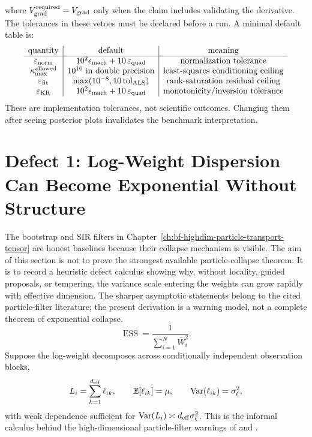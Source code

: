 where \(V_{\rm grad}^{\rm required}=V_{\rm grad}\) only when the claim includes
validating the derivative.  The tolerances in these vetoes must be declared
before a run.  A minimal default table is:
\begin{equation}
\begin{array}{c|c|c}
\text{quantity} & \text{default} & \text{meaning}\\
\hline
\varepsilon_{\rm norm} & 10^2\epsilon_{\rm mach}+10\,\varepsilon_{\rm quad} & \text{normalization tolerance}\\
\kappa_{\rm max}^{\rm allowed} & 10^{10}\ \text{in double precision} & \text{least-squares conditioning ceiling}\\
\varepsilon_{\rm fit} & \max(10^{-8},10\,{\rm tol}_{\rm ALS}) & \text{rank-saturation residual ceiling}\\
\varepsilon_{\rm KR} & 10^2\epsilon_{\rm mach}+10\,\varepsilon_{\rm quad} & \text{monotonicity/inversion tolerance}
\end{array}
  \label{eq:bf-hd-veto-defaults}
\end{equation}
These are implementation tolerances, not scientific outcomes.  Changing them
after seeing posterior plots invalidates the benchmark interpretation.

\section[Particle Collapse]{Defect 1: Log-Weight Dispersion Can Become Exponential Without Structure}
\label{sec:bf-hd-defect-particles}

The bootstrap and SIR filters in Chapter~\ref{ch:bf-highdim-particle-transport-tensor}
are honest baselines because their collapse mechanism is visible.  The aim of
this section is not to prove the strongest available particle-collapse theorem.
It is to record a heuristic defect calculus showing why, without locality,
guided proposals, or tempering, the variance scale entering the weights can grow
rapidly with effective dimension.  The sharper asymptotic statements belong to
the cited particle-filter literature; the present derivation is a warning model,
not a complete theorem of exponential collapse.
\begin{equation}
  \operatorname{ESS}=\frac{1}{\sum_{i=1}^N \bar W_i^2}.
  \label{eq:bf-hd-synth-ess}
\end{equation}
Suppose the log-weight decomposes across conditionally independent observation
blocks,
\begin{equation}
  L_i=\sum_{k=1}^{d_{\mathrm{eff}}} \ell_{ik},\qquad
  \mathbb{E}[\ell_{ik}]=\mu,\qquad \operatorname{Var}(\ell_{ik})=\sigma_\ell^2,
  \label{eq:bf-hd-synth-logweight}
\end{equation}
with weak dependence sufficient for
\(\operatorname{Var}(L_i)\asymp d_{\mathrm{eff}}\sigma_\ell^2\).  This is the informal
calculus behind the high-dimensional particle-filter warnings of
\citet{bengtsson2008curse} and \citet{snyder2008obstacles}.

